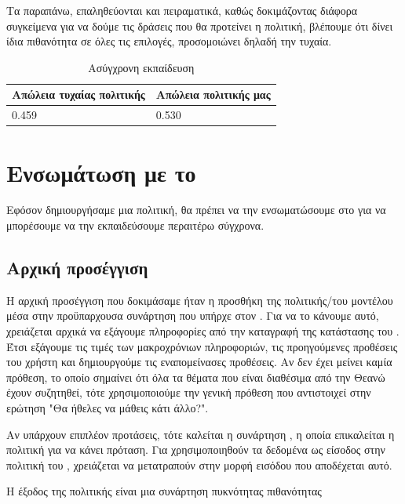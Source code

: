 Τα παραπάνω, επαληθεύονται και πειραματικά, καθώς δοκιμάζοντας διάφορα συγκείμενα για να δούμε τις δράσεις που θα προτείνει η πολιτική, βλέπουμε ότι δίνει ίδια πιθανότητα σε όλες τις επιλογές, προσομοιώνει δηλαδή την τυχαία.

\begin{table}
    \centering
    \begin{tabularx}{\textwidth}{|X|X|}
        \hline
        Απώλεια τυχαίας πολιτικής & Απώλεια πολιτικής μας \\
        \hline
        0.459                     & 0.530                 \\
        \hline
    \end{tabularx}
    \caption{Ασύγχρονη εκπαίδευση}
    \label{tab:offline_learning}
\end{table}


\section{Ενσωμάτωση με το }

Εφόσον δημιουργήσαμε μια πολιτική, θα πρέπει να την ενσωματώσουμε στο  για να μπορέσουμε να την εκπαιδεύσουμε περαιτέρω σύγχρονα.

\subsection{Αρχική προσέγγιση}

Η αρχική προσέγγιση που δοκιμάσαμε ήταν η προσθήκη της πολιτικής/του μοντέλου μέσα στην προϋπαρχουσα συνάρτηση που υπήρχε στον . Για να το κάνουμε αυτό, χρειάζεται αρχικά να εξάγουμε πληροφορίες από την καταγραφή της κατάστασης του . Έτσι εξάγουμε τις τιμές των μακροχρόνιων πληροφοριών, τις προηγούμενες προθέσεις του χρήστη και δημιουργούμε τις εναπομείνασες προθέσεις. Αν δεν έχει μείνει καμία πρόθεση, το οποίο σημαίνει ότι όλα τα θέματα που είναι διαθέσιμα από την Θεανώ έχουν συζητηθεί, τότε χρησιμοποιούμε την γενική πρόθεση  που αντιστοιχεί στην ερώτηση "Θα ήθελες να μάθεις κάτι άλλο?".

Αν υπάρχουν επιπλέον προτάσεις, τότε καλείται η συνάρτηση , η οποία επικαλείται η πολιτική για να κάνει πρόταση. Για χρησιμοποιηθούν τα δεδομένα ως είσοδος στην πολιτική του , χρειάζεται να μετατραπούν στην μορφή εισόδου που αποδέχεται αυτό.

Η έξοδος της πολιτικής είναι μια συνάρτηση πυκνότητας πιθανότητας

